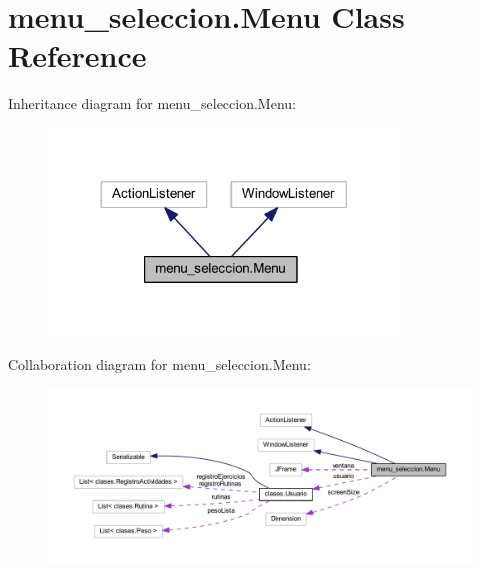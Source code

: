 \hypertarget{classmenu__seleccion_1_1_menu}{}\section{menu\+\_\+seleccion.\+Menu Class Reference}
\label{classmenu__seleccion_1_1_menu}


Inheritance diagram for menu\+\_\+seleccion.\+Menu\+:
\nopagebreak
\begin{figure}[H]
\begin{center}
\leavevmode
\includegraphics[width=264pt]{classmenu__seleccion_1_1_menu__inherit__graph}
\end{center}
\end{figure}


Collaboration diagram for menu\+\_\+seleccion.\+Menu\+:
\nopagebreak
\begin{figure}[H]
\begin{center}
\leavevmode
\includegraphics[width=350pt]{classmenu__seleccion_1_1_menu__coll__graph}
\end{center}
\end{figure}
